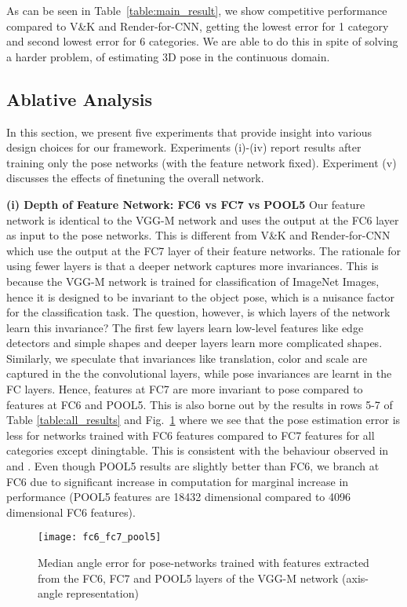 \documentclass[10pt,twocolumn,letterpaper]{article}
\newcommand{\myparagraph}[1]{\smallskip\noindent\textbf{#1}}
\begin{document}
	As can be seen in Table~\ref{table:main_result}, we show competitive performance compared to V\&K and Render-for-CNN, getting the lowest error for 1 category and second lowest error for 6 categories. We are able to do this in spite of solving a harder problem, of estimating 3D pose in the continuous domain.
		
	\subsection{Ablative Analysis}
	\label{sec:analysis}
	In this section, we present five experiments that provide insight into various design choices for our framework. Experiments (i)-(iv) report results after training only the pose networks (with the feature network fixed). Experiment (v) discusses the effects of finetuning the overall network.
	
	\myparagraph{(i) Depth of Feature Network: FC6 vs FC7 vs POOL5}
	Our feature network is identical to the VGG-M network and uses the output at the FC6 layer as input to the pose networks. This is different from V\&K and Render-for-CNN which use the output at the FC7 layer of their feature networks. The rationale for using fewer layers is that a deeper network captures more invariances. This is because the VGG-M network is trained for classification of ImageNet Images, hence it is designed to be invariant to the object pose, which is a nuisance factor for the classification task. The question, however, is which layers of the network learn this invariance? The first few layers learn low-level features like edge detectors and simple shapes and deeper layers learn more complicated shapes. Similarly, we speculate that invariances like translation, color and scale are captured in the the convolutional layers, while pose invariances are learnt in the FC layers. Hence, features at FC7 are more invariant to pose compared to features at FC6 and POOL5. This is also borne out by the results in rows 5-7 of Table \ref{table:all_results} and Fig.~\ref{fig:fc6_fc7_pool5} where we see that the pose estimation error is less for networks trained with FC6 features compared to FC7 features for all categories except diningtable. This is consistent with the behaviour observed in \cite{Elhoseiny:ICML16} and \cite{Bakry:ICLR16}. Even though POOL5 results are slightly better than FC6, we branch at FC6 due to significant increase in computation for marginal increase in performance (POOL5 features are 18432 dimensional compared to 4096 dimensional FC6 features).
	\begin{figure}[h]
		\centering
		\texttt{[image: fc6\_fc7\_pool5]}
		\caption{Median angle error for pose-networks trained with features extracted from the FC6, 
		FC7 and POOL5 layers of the VGG-M network (axis-angle representation)}
		\label{fig:fc6_fc7_pool5}
	\end{figure}
	
\end{document}
